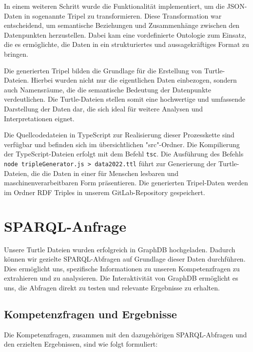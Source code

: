 \documentclass[a4paper, 12pt]{article}
\begin{document}
In einem weiteren Schritt wurde die Funktionalität implementiert, um die JSON-Daten in sogenannte Tripel zu transformieren. Diese Transformation war entscheidend, um semantische Beziehungen und Zusammenhänge zwischen den Datenpunkten herzustellen. Dabei kam eine vordefinierte Ontologie zum Einsatz, die es ermöglichte, die Daten in ein strukturiertes und aussagekräftiges Format zu bringen.

Die generierten Tripel bilden die Grundlage für die Erstellung von Turtle-Dateien. Hierbei wurden nicht nur die eigentlichen Daten einbezogen, sondern auch Namensräume, die die semantische Bedeutung der Datenpunkte verdeutlichen. Die Turtle-Dateien stellen somit eine hochwertige und umfassende Darstellung der Daten dar, die sich ideal für weitere Analysen und Interpretationen eignet.

Die Quellcodedateien in TypeScript zur Realisierung dieser Prozesskette sind verfügbar und befinden sich im übersichtlichen "src"-Ordner. Die Kompilierung der TypeScript-Dateien erfolgt mit dem Befehl \texttt{tsc}. Die Ausführung des Befehls \texttt{node tripleGenerator.js > data2022.ttl} führt zur Generierung der Turtle-Dateien, die die Daten in einer für Menschen lesbaren und maschinenverarbeitbaren Form präsentieren. Die generierten Tripel-Daten werden im Ordner RDF Triples in unserem GitLab-Repository gespeichert.

\section{SPARQL-Anfrage}
Unsere Turtle Dateien wurden erfolgreich in GraphDB hochgeladen. Dadurch können wir gezielte SPARQL-Abfragen auf Grundlage dieser Daten durchführen. Dies ermöglicht uns, spezifische Informationen zu unseren Kompetenzfragen zu extrahieren und zu analysieren. Die Interaktivität von \linebreak GraphDB ermöglicht es uns, die Abfragen direkt zu testen und relevante Ergebnisse zu erhalten.

\subsection{Kompetenzfragen und Ergebnisse}
Die Kompetenzfragen, zusammen mit den dazugehörigen SPARQL-Abfragen und den erzielten Ergebnissen, sind wie folgt formuliert:
\end{document}
